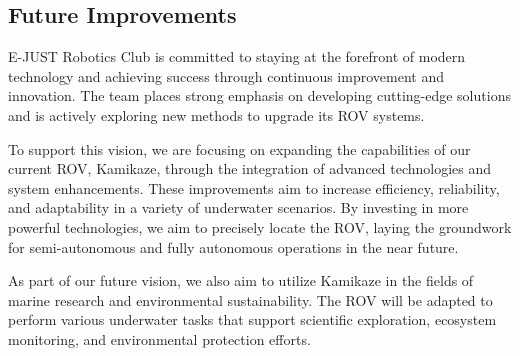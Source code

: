 \subsection{Future Improvements}

E-JUST Robotics Club is committed to staying at the forefront of modern technology and achieving success through continuous improvement and innovation. The team places strong emphasis on developing cutting-edge solutions and is actively exploring new methods to upgrade its ROV systems.

\hspace{10pt} To support this vision, we are focusing on expanding the capabilities of our current ROV, Kamikaze, through the integration of advanced technologies and system enhancements. These improvements aim to increase efficiency, reliability, and adaptability in a variety of underwater scenarios. By investing in more powerful technologies, we aim to precisely locate the ROV, laying the groundwork for semi-autonomous and fully autonomous operations in the near future.

\hspace{10pt} As part of our future vision, we also aim to utilize Kamikaze in the fields of marine research and environmental sustainability. The ROV will be adapted to perform various underwater tasks that support scientific exploration, ecosystem monitoring, and environmental protection efforts.